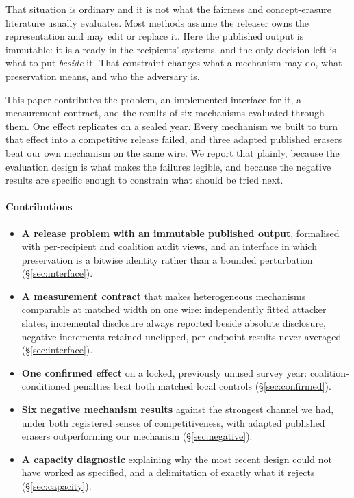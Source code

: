 \documentclass[conference]{IEEEtran}
\begin{document}
That situation is ordinary and it is not what the fairness and concept-erasure literature usually
evaluates. Most methods assume the releaser owns the representation and may edit or replace it. Here the
published output is immutable: it is already in the recipients' systems, and the only decision left is
what to put \emph{beside} it. That constraint changes what a mechanism may do, what preservation means,
and who the adversary is.

This paper contributes the problem, an implemented interface for it, a measurement contract, and the
results of six mechanisms evaluated through them. One effect replicates on a sealed year. Every mechanism
we built to turn that effect into a competitive release failed, and three adapted published erasers beat
our own mechanism on the same wire. We report that plainly, because the evaluation design is what makes
the failures legible, and because the negative results are specific enough to constrain what should be
tried next.

\paragraph*{Contributions}
\begin{itemize}\itemsep2pt
\item \textbf{A release problem with an immutable published output}, formalised with per-recipient and
coalition audit views, and an interface in which preservation is a bitwise identity rather than a bounded
perturbation (\S\ref{sec:interface}).
\item \textbf{A measurement contract} that makes heterogeneous mechanisms comparable at matched width on
one wire: independently fitted attacker slates, incremental disclosure always reported beside absolute
disclosure, negative increments retained unclipped, per-endpoint results never averaged
(\S\ref{sec:interface}).
\item \textbf{One confirmed effect} on a locked, previously unused survey year: coalition-conditioned
penalties beat both matched local controls (\S\ref{sec:confirmed}).
\item \textbf{Six negative mechanism results} against the strongest channel we had, under both registered
senses of competitiveness, with adapted published erasers outperforming our mechanism
(\S\ref{sec:negative}).
\item \textbf{A capacity diagnostic} explaining why the most recent design could not have worked as
specified, and a delimitation of exactly what it rejects (\S\ref{sec:capacity}).
\end{itemize}
\end{document}
